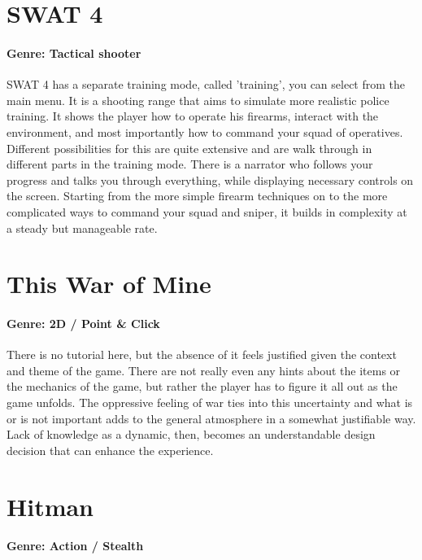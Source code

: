 \section{SWAT 4}
\paragraph{Genre: Tactical shooter}

SWAT 4 has a separate training mode, called 'training', you can select from the main menu. It is a shooting range that aims to simulate more realistic police training. It shows the player how to operate his firearms, interact with the environment, and most importantly how to command your squad of operatives. Different possibilities for this are quite extensive and are walk through in different parts in the training mode. There is a narrator who follows your progress and talks you through everything, while displaying necessary controls on the screen. Starting from the more simple firearm techniques on to the more complicated ways to command your squad and sniper, it builds in complexity at a steady but manageable rate.

\section{This War of Mine}
\paragraph{Genre: 2D / Point \& Click}

There is no tutorial here, but the absence of it feels justified given the context and theme of the game. There are not really even any hints about the items or the mechanics of the game, but rather the player has to figure it all out as the game unfolds. The oppressive feeling of war ties into this uncertainty and what is or is not important adds to the general atmosphere in a somewhat justifiable way. Lack of knowledge as a dynamic, then, becomes an understandable design decision that can enhance the experience.

\section{Hitman}
\paragraph{Genre: Action / Stealth}

